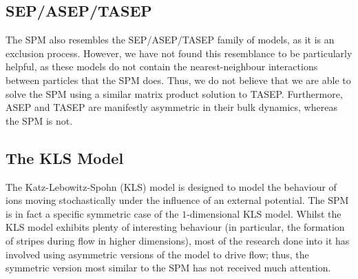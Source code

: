 \subsection{SEP/ASEP/TASEP} \label{sec:asep}
The SPM also resembles the SEP/ASEP/TASEP family of models, as it is an exclusion process. However, we 
have not found this resemblance to be particularly helpful, as these models do not contain the
nearest-neighbour interactions between particles that the SPM does. Thus, we do not believe that we are
able to solve the SPM using a similar matrix product solution to TASEP. Furthermore, ASEP and TASEP
are manifestly asymmetric in their bulk dynamics, whereas the SPM is not.

\subsection{The KLS Model}
The Katz-Lebowitz-Spohn (KLS) model is designed to model the behaviour of ions moving stochastically
under the influence of an external potential. The SPM is in fact a specific symmetric case of the
$1$-dimensional KLS model. Whilst the KLS model exhibits plenty of interesting behaviour
(in particular, the formation of stripes during flow in higher dimensions), most of the research done
into it has involved using asymmetric versions of the model to drive flow; thus, the symmetric version
most similar to the SPM has not received much attention.

